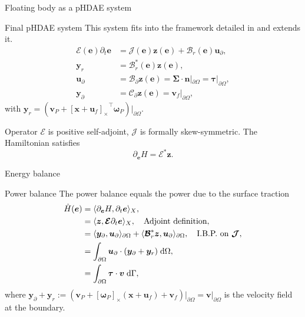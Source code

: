 \documentclass[aspectratio=169]{ISAE-Beamer}
\newcommand{\crmat}[1]{\ensuremath{[#1]_{\times}}}
\begin{document}
\begin{frame}{Floating body as a pHDAE system}
\begin{exampleblock}{Final pHDAE system}
This system fits into the framework detailed in  and extends it.
\begin{equation*}
\begin{aligned}
\bm{\mathcal{E}}(\bm{e}) \partial_t \bm{e} &= \bm{\mathcal{J}}(\bm{e}) \bm{z}(\bm{e}) + \bm{\mathcal{B}}_r(\bm{e}) \bm{u}_\partial, \\
\bm{y}_r &= \bm{\mathcal{B}}_r^*(\bm{e}) \bm{z}(\bm{e}), \\
\bm{u}_\partial &= \bm{\mathcal{B}}_{\partial} \bm{z}(\bm{e}) =  \bm\Sigma \cdot \bm{n}|_{\partial \Omega} = \bm\tau|_{\partial \Omega}, \\
\bm{y}_\partial &= \bm{\mathcal{C}}_{\partial} \bm{z}(\bm{e}) = \bm{v}_f|_{\partial \Omega},
\end{aligned}
\end{equation*}
with $\bm{y}_r = (\bm{v}_P + \crmat{\bm{x}+\bm{u}_f}^\top \bm{\omega}_P)\vert_{\partial\Omega}$.
\end{exampleblock}
Operator $\bm{\mathcal{E}}$ is positive self-adjoint, $\bm{\mathcal{J}}$ is formally skew-symmetric.
The Hamiltonian  satisfies 
\begin{equation*}
\partial_{\bm{e}} H = \bm{\mathcal{E}}^* \bm{z}.
\end{equation*}
\end{frame}

\begin{frame}{Energy balance}

\begin{exampleblock}{Power balance}
	The power balance equals the power due to the surface traction
	\begin{equation*}
	\setlength{\abovedisplayskip}{5pt}
	\setlength{\belowdisplayskip}{5pt}
	\begin{aligned}
	\dot{H}(\bm{e}) &= \langle \partial_{\bm{e}} H, \partial_t {\bm{e}} \rangle_{X},\\
	&= \langle \bm{z}, \bm{\mathcal{E}} \partial_t {\bm{e}} \rangle_{{X}}, \quad \text{Adjoint definition},  \\
	&= \langle \bm{y}_\partial,  \bm{u}_\partial \rangle_{\partial\Omega} + \langle \bm{\mathcal{B}}_r^* \bm{z}, \bm{u}_\partial \rangle_{\partial\Omega}, \quad \text{I.B.P. on } \bm{\mathcal{J}}, \\
	&=  \int_{\partial \Omega} \bm{u}_\partial \cdot (\bm{y}_\partial + \bm{y}_r)  \d{\Omega}, \\
	&= \int_{\partial \Omega} \bm\tau \cdot \bm{v} \d\Gamma,  \\
	\end{aligned}
	\end{equation*}
	where $\bm{y}_\partial + \bm{y}_r := (\bm{v}_P + \crmat{\bm{\omega}_P} (\bm{x}+\bm{u}_f) + {\bm{v}}_f)\vert_{\partial\Omega} = \bm{v}\vert_{\partial\Omega}$ is the velocity field at the boundary.
\end{exampleblock}

\end{frame}
\end{document}
